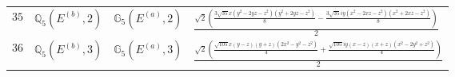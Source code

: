 \documentclass[fleqn,8pt,landscape]{jsarticle}
\begin{document}
\begin{table}[ht!]
\begin{center}
\begin{tabular}{cccl}
$ 35 $ & $ \mathbb{Q}_{5}(E^{(b)},2) $ & $ \mathbb{G}_{5}(E^{(a)},2) $ & $ \frac{\sqrt{2} \left(\frac{3 \sqrt{35} x \left(y^{2} - 2 y z - z^{2}\right) \left(y^{2} + 2 y z - z^{2}\right)}{8} - \frac{3 \sqrt{35} i y \left(x^{2} - 2 x z - z^{2}\right) \left(x^{2} + 2 x z - z^{2}\right)}{8}\right)}{2} $ \\
$ 36 $ & $ \mathbb{Q}_{5}(E^{(b)},3) $ & $ \mathbb{G}_{5}(E^{(a)},3) $ & $ \frac{\sqrt{2} \left(\frac{\sqrt{105} x \left(y - z\right) \left(y + z\right) \left(2 x^{2} - y^{2} - z^{2}\right)}{4} + \frac{\sqrt{105} i y \left(x - z\right) \left(x + z\right) \left(x^{2} - 2 y^{2} + z^{2}\right)}{4}\right)}{2} $ \\
 \hline \hline
\end{tabular}
\end{center}
\end{table}
\end{document}
